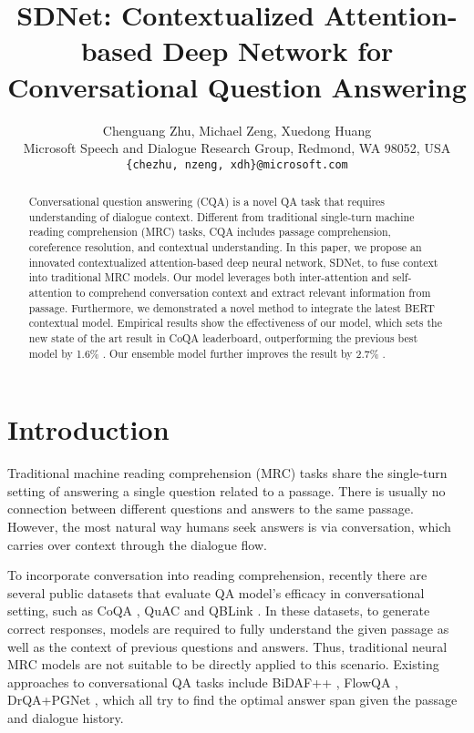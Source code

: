 \documentclass{article} \usepackage{sdnet,times}
\title{SDNet: Contextualized Attention-based Deep Network for Conversational Question Answering}
\author{Chenguang Zhu, Michael Zeng, Xuedong Huang\\
 Microsoft Speech and Dialogue Research Group, Redmond, WA 98052, USA\\
\texttt{\{chezhu, nzeng, xdh\}@microsoft.com} \\
}
\begin{document}
\maketitle

\begin{abstract}
Conversational question answering (CQA) is a novel QA task that requires understanding of dialogue context. Different from traditional single-turn machine reading comprehension (MRC) tasks, CQA includes passage comprehension, coreference resolution, and contextual understanding. In this paper, we propose an innovated contextualized attention-based deep neural network, SDNet, to fuse context into traditional MRC models. Our model 
leverages both inter-attention and self-attention to comprehend conversation context and extract relevant information from passage. Furthermore, we demonstrated a novel method to integrate the latest BERT contextual model. Empirical results show the effectiveness of our model, which sets the new state of the art result in CoQA leaderboard, outperforming the previous best model by 1.6\% . Our ensemble model further improves the result by 2.7\% .
\end{abstract}

\section{Introduction}
Traditional machine reading comprehension (MRC) tasks share the single-turn setting of answering a single question related to a passage. There is usually no connection between different questions and answers to the same passage. However, the most natural way humans seek answers is via conversation, which carries over context through the dialogue flow. 

To incorporate conversation into reading comprehension, recently there are several public datasets that evaluate QA model's efficacy in conversational setting, such as CoQA \citep{coqa}, QuAC \citep{quac} and QBLink \citep{qblink}. In these datasets, to generate correct responses, models are required to fully understand the given passage as well as the context of previous questions and answers. Thus, traditional neural MRC models are not suitable to be directly applied to this scenario. Existing approaches to conversational QA tasks include BiDAF++ \citep{bidafplusplus}, FlowQA \citep{flowqa}, DrQA+PGNet \citep{coqa}, which all try to find the optimal answer span given the passage and dialogue history.
\end{document}
